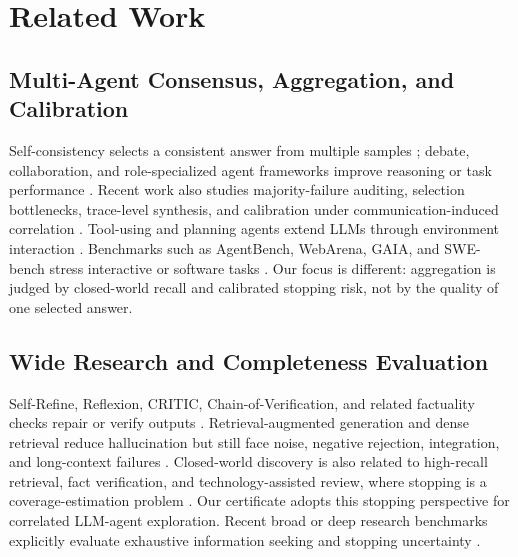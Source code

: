 \documentclass[letterpaper]{article}
\begin{document}
\section{Related Work}

\subsection{Multi-Agent Consensus, Aggregation, and Calibration}

Self-consistency selects a consistent answer from multiple samples
\citep{wang2022selfconsistency}; debate, collaboration, and role-specialized
agent frameworks improve reasoning or task performance
\citep{du2023debate,chan2023chateval,wu2023autogen,chen2023agentverse,
hong2023metagpt,li2023camel,zhang2024proagent}. Recent work also studies
majority-failure auditing, selection bottlenecks, trace-level synthesis, and
calibration under communication-induced correlation
\citep{yang2026agentauditor,maryanskyy2026agentsdisagree,
fadnavis2026beyondconsensus,huang2026cagecal}. Tool-using and
planning agents extend LLMs through environment interaction
\citep{yao2023react,schick2023toolformer,qin2023toolllm,yao2023tot,
wang2023voyager}. Benchmarks such as
AgentBench, WebArena, GAIA, and SWE-bench stress interactive or software tasks
\citep{liu2023agentbench,zhou2023webarena,mialon2023gaia,jimenez2023swebench}.
Our focus is different: aggregation is judged by closed-world recall and
calibrated stopping risk, not by the quality of one selected answer.

\subsection{Wide Research and Completeness Evaluation}

Self-Refine, Reflexion, CRITIC, Chain-of-Verification, and related factuality
checks repair or verify outputs
\citep{madaan2023selfrefine,shinn2023reflexion,gou2023critic,dhuliawala2023cov,
lin2021truthfulqa,manakul2023selfcheckgpt,li2023halueval}. Retrieval-augmented
generation and dense retrieval reduce hallucination but still face noise,
negative rejection, integration, and long-context failures
\citep{lewis2020rag,guu2020realm,karpukhin2020dpr,nakano2021webgpt,
chen2024rgb,li2024unigen,liu2023lost,asai2023selfrag,
gao2023ragsurvey}. Closed-world discovery is also related to high-recall
retrieval, fact verification, and technology-assisted review, where stopping is
a coverage-estimation problem
\citep{thorne2018fever,yang2018hotpotqa,grossman2015trec,
cormack2021tarstopping}. Our certificate adopts this stopping perspective for
correlated LLM-agent exploration.
Recent broad or deep research benchmarks explicitly evaluate exhaustive
information seeking and stopping uncertainty
\citep{wong2025widesearch,gupta2026deepsearchqa,rafiee2026trqa,
huang2026wideseek,kim2026seekergym}.
\end{document}
